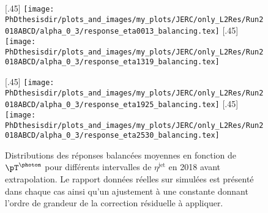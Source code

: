 \begin{figure}[p]
\centering
{}[.45\textwidth]
{\texttt{[image: \\PhDthesisdir/plots\_and\_images/my\_plots/JERC/only\_L2Res/Run2018ABCD/alpha\_0\_3/response\_eta0013\_balancing.tex]}}
\hfill
{}[.45\textwidth]
{\texttt{[image: \\PhDthesisdir/plots\_and\_images/my\_plots/JERC/only\_L2Res/Run2018ABCD/alpha\_0\_3/response\_eta1319\_balancing.tex]}}

\vfill

[.45\textwidth]
{\texttt{[image: \\PhDthesisdir/plots\_and\_images/my\_plots/JERC/only\_L2Res/Run2018ABCD/alpha\_0\_3/response\_eta1925\_balancing.tex]}}
\hfill
{}[.45\textwidth]
{\texttt{[image: \\PhDthesisdir/plots\_and\_images/my\_plots/JERC/only\_L2Res/Run2018ABCD/alpha\_0\_3/response\_eta2530\_balancing.tex]}}

\caption[Réponses balancées en 2018 avant extrapolation.]{Distributions des réponses balancées moyennes en fonction de $\pT^{\text{\photon}}$ pour différents intervalles de $\eta^\text{jet}$ en 2018 avant extrapolation. Le rapport données réelles sur simulées est présenté dans chaque cas ainsi qu'un ajustement à une constante donnant l'ordre de grandeur de la correction résiduelle à appliquer.}
\label{fig-responses_balancing_alpha_0_3_2018ABCD}
\end{figure}